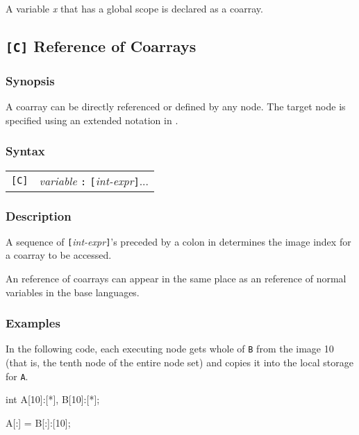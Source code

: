 A variable {\it x} that has a global scope is declared as a coarray.

\subsection{{\tt [C]} Reference of Coarrays}

\subsubsection*{Synopsis}
A coarray can be directly referenced or defined by any node. 
The target node is specified using an extended notation in {\XMPC}.

\subsubsection*{Syntax}

\begin{tabular}{ll}
\verb![C]! & {\it variable} {\tt :} {\tt [}{\it int-expr}{\tt ]}...\\
\end{tabular}

\subsubsection*{Description}

A sequence of {\tt [}{\it int-expr}{\tt ]}'s preceded by a colon in
{\XMPC} determines the image index for a coarray to be accessed.

An reference of coarrays can appear in the same place as an reference of
normal variables in the base languages.

\subsubsection*{Examples}

In the following code, each executing node gets whole of {\tt B} from
the image 10 (that is, the tenth node of the entire node set) and
copies it into the local storage for {\tt A}.

\vspace{0.3cm}

\begin{XCexample}
int A[10]:[*], B[10]:[*];

A[:] = B[:]:[10];
\end{XCexample}

